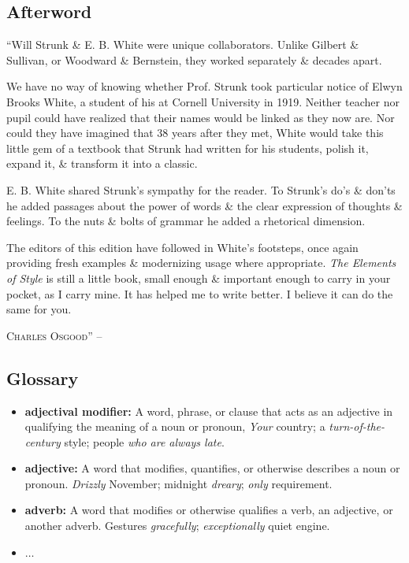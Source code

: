 \documentclass{article}
\begin{document}

\subsection{Afterword}
``Will Strunk \& E. B. White were unique collaborators. Unlike Gilbert \& Sullivan, or Woodward \& Bernstein, they worked separately \& decades apart.

We have no way of knowing whether Prof. Strunk took particular notice of Elwyn Brooks White, a student of his at Cornell University in 1919. Neither teacher nor pupil could have realized that their names would be linked as they now are. Nor could they have imagined that 38 years after they met, White would take this little gem of a textbook that Strunk had written for his students, polish it, expand it, \& transform it into a classic.

E. B. White shared Strunk's sympathy for the reader. To Strunk's do's \& don'ts he added passages about the power of words \& the clear expression of thoughts \& feelings. To the nuts \& bolts of grammar he added a rhetorical dimension.

The editors of this edition have followed in White's footsteps, once again providing fresh examples \& modernizing usage where appropriate. {\it The Elements of Style} is still a little book, small enough \& important enough to carry in your pocket, as I carry mine. It has helped me to write better. I believe it can do the same for you.

\textsc{Charles Osgood}'' -- \cite[p. 104]{Strunk_White_element_style}


\subsection{Glossary}

\begin{itemize}
	\item {\bf adjectival modifier:} A word, phrase, or clause that acts as an adjective in qualifying the meaning of a noun or pronoun, {\it Your} country; a {\it turn-of-the-century} style; people {\it who are always late}.
	\item {\bf adjective:} A word that modifies, quantifies, or otherwise describes a noun or pronoun. {\it Drizzly} November; midnight {\it dreary}; {\it only} requirement.
	\item {\bf adverb:} A word that modifies or otherwise qualifies a verb, an adjective, or another adverb. Gestures {\it gracefully}; {\it exceptionally} quiet engine.
	\item $\ldots$
\end{itemize}
\end{document}
